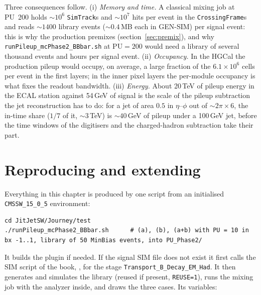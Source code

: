 \documentclass[11pt,a4paper]{article}
\newcommand{\code}[1]{\texttt{#1}}
\begin{document}
Three consequences follow. (i) \emph{Memory and time.} A classical mixing job at PU~200 holds $\sim10^6$
\code{SimTrack}s and $\sim10^7$ hits per event in the \code{CrossingFrame}s and reads $\sim1400$ library
events ($\sim 0.4$\,MB each in GEN-SIM) per signal event: this is why the production premixes
(section~\ref{sec:premix}), and why \code{runPileup\_mcPhase2\_BBbar.sh} at $\mathrm{PU}=200$ would need a
library of several thousand events and hours per signal event. (ii) \emph{Occupancy.} In the HGCal the
production pileup would occupy, on average, a large fraction of the $6.1\times10^6$ cells per event in the
first layers; in the inner pixel layers the per-module occupancy is what fixes the readout bandwidth. (iii)
\emph{Energy.} About 20\,TeV of pileup energy in the ECAL station against 54\,GeV of signal is the scale of the
pileup subtraction the jet reconstruction has to do: for a jet of area $0.5$ in $\eta$--$\phi$ out of
$\sim 2\pi\times6$, the in-time share ($1/7$ of it, $\sim3$\,TeV) is $\sim 40$\,GeV of pileup under a
100\,GeV jet, before the time windows of the digitisers and the charged-hadron subtraction take their part.

\section{Reproducing and extending}
\label{sec:extend}

Everything in this chapter is produced by one script from an initialised \code{CMSSW\_15\_0\_5} environment:
\begin{lstlisting}[style=sh]
cd JitJetSW/Journey/test
./runPileup_mcPhase2_BBbar.sh      # (a), (b), (a+b) with PU = 10 in bx -1..1, library of 50 MinBias events, into PU_Phase2/
\end{lstlisting}
{\sloppy It builds the plugin if needed. If the signal SIM file does not exist it first calls the SIM script
of the book, , for the stage \code{Transport\_B\_Decay\_EM\_Had}.
It then generates and simulates the library (reused if present, \code{REUSE=1}), runs the mixing job with
the analyzer inside, and draws the three cases. Its variables:\par}
\end{document}

